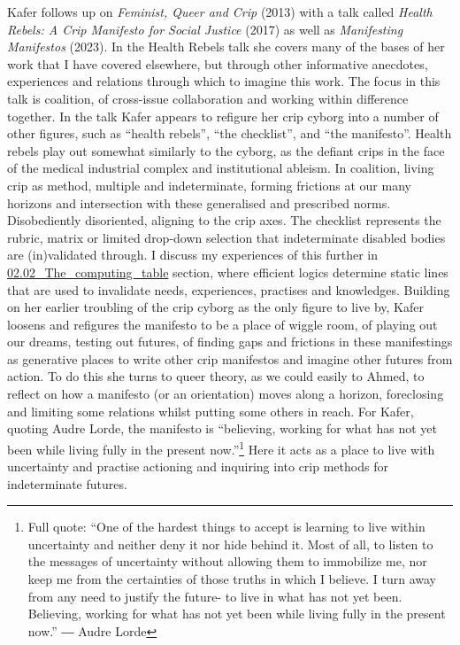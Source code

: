 Kafer follows up on \emph{Feminist, Queer and Crip} (2013) with a talk
called \emph{Health Rebels: A Crip Manifesto for Social Justice} (2017)
as well as \emph{Manifesting Manifestos} (2023). In the Health Rebels
talk she covers many of the bases of her work that I have covered
elsewhere, but through other informative anecdotes, experiences and
relations through which to imagine this work. The focus in this talk is
coalition, of cross-issue collaboration and working within difference
together. In the talk Kafer appears to refigure her crip cyborg into a
number of other figures, such as ``health rebels'', ``the checklist'',
and ``the manifesto''. Health rebels play out somewhat similarly to the
cyborg, as the defiant crips in the face of the medical industrial
complex and institutional ableism. In coalition, living crip as method,
multiple and indeterminate, forming frictions at our many horizons and
intersection with these generalised and prescribed norms. Disobediently
disoriented, aligning to the crip axes. The checklist represents the
rubric, matrix or limited drop-down selection that indeterminate
disabled bodies are (in)validated through. I discuss my experiences of
this further in
\href{../../02_Crip-Tic_of_Vignettes/sections/02.02_The_computing_table.md}{02.02\_The\_computing\_table}
section, where efficient logics determine static lines that are used to
invalidate needs, experiences, practises and knowledges. Building on her
earlier troubling of the crip cyborg as the only figure to live by,
Kafer loosens and refigures the manifesto to be a place of wiggle room,
of playing out our dreams, testing out futures, of finding gaps and
frictions in these manifestings as generative places to write other crip
manifestos and imagine other futures from action. To do this she turns
to queer theory, as we could easily to Ahmed, to reflect on how a
manifesto (or an orientation) moves along a horizon, foreclosing and
limiting some relations whilst putting some others in reach. For Kafer,
quoting Audre Lorde, the manifesto is ``believing, working for what has
not yet been while living fully in the present now.''\footnote{Full
  quote: ``One of the hardest things to accept is learning to live
  within uncertainty and neither deny it nor hide behind it. Most of
  all, to listen to the messages of uncertainty without allowing them to
  immobilize me, nor keep me from the certainties of those truths in
  which I believe. I turn away from any need to justify the future- to
  live in what has not yet been. Believing, working for what has not yet
  been while living fully in the present now.'' ― Audre Lorde} Here it
acts as a place to live with uncertainty and practise actioning and
inquiring into crip methods for indeterminate futures.

